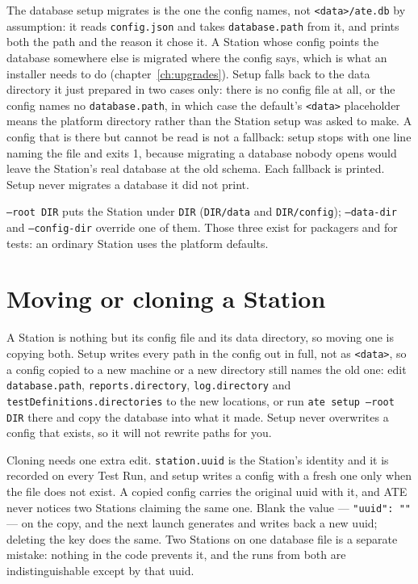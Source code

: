 The database setup migrates is the one the config names, not \texttt{<data>/ate.db} by assumption: it
reads \texttt{config.json} and takes \texttt{database.path} from it, and prints both the path and the
reason it chose it. A Station whose config points the database somewhere else is migrated where the
config says, which is what an installer needs to do (chapter~\ref{ch:upgrades}). Setup falls back to
the data directory it just prepared in two cases only: there is no config file at all, or the config
names no \texttt{database.path}, in which case the default's \texttt{<data>} placeholder means the
platform directory rather than the Station setup was asked to make. A config that is there but cannot
be read is not a fallback: setup stops with one line naming the file and exits 1, because migrating a
database nobody opens would leave the Station's real database at the old schema. Each fallback is
printed. Setup never migrates a database it did not print.

\texttt{--root DIR} puts the Station under \texttt{DIR} (\texttt{DIR/data} and
\texttt{DIR/config}); \texttt{--data-dir} and \texttt{--config-dir} override one of them. Those
three exist for packagers and for tests: an ordinary Station uses the platform defaults.

\section{Moving or cloning a Station}

A Station is nothing but its config file and its data directory, so moving one is copying both.
Setup writes every path in the config out in full, not as \texttt{<data>}, so a config copied to a
new machine or a new directory still names the old one: edit \texttt{database.path},
\texttt{reports.directory}, \texttt{log.directory} and \texttt{testDefinitions.directories} to the
new locations, or run \texttt{ate setup --root DIR} there and copy the database into what it made.
Setup never overwrites a config that exists, so it will not rewrite paths for you.

Cloning needs one extra edit. \texttt{station.uuid} is the Station's identity and it is recorded on
every Test Run, and setup writes a config with a fresh one only when the file does not exist. A
copied config carries the original uuid with it, and ATE never notices two Stations claiming the
same one. Blank the value --- \texttt{"uuid": ""} --- on the copy, and the next launch generates and
writes back a new uuid; deleting the key does the same. Two Stations on one database file is a
separate mistake: nothing in the code prevents it, and the runs from both are indistinguishable
except by that uuid.

